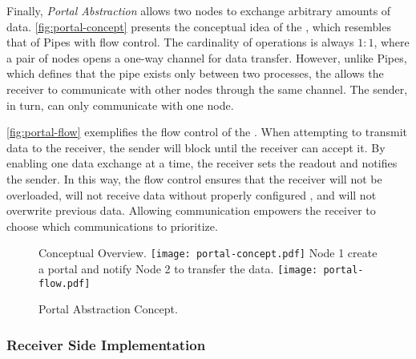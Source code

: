 			Finally, \textit{Portal Abstraction} allows two nodes to exchange arbitrary
			amounts of data. \autoref{fig:portal-concept} presents the conceptual idea
			of the \portal, which resembles that of \posix Pipes with flow control.
			The cardinality of operations is always $1:1$, where a pair of nodes opens
			a one-way channel for data transfer. However, unlike \posix Pipes, which
			defines that the pipe exists only between two processes, the \portal allows
			the receiver to communicate with other nodes through the same channel.
			The sender, in turn, can only communicate with one node.

			\autoref{fig:portal-flow} exemplifies the flow control of the \portal.
			When attempting to transmit data to the receiver, the sender will block
			until the receiver can accept it. By enabling one data exchange at a time,
			the receiver sets the readout and notifies the sender. In this way,
			the flow control ensures that the receiver will not be overloaded, will
			not receive data without properly configured \dma, and will not overwrite
			previous data. Allowing communication empowers the receiver to choose which
			communications to prioritize.

			\begin{figure}[!tb]
				\centering%
				\caption{Portal Abstraction Concept.}%
				\label{fig:portal}%

					{Conceptual Overview.}%
					{\texttt{[image: portal-concept.pdf]}}%
				\hspace{1cm}%
					{Node 1 create a portal and notify Node 2 to transfer the data.}%
					{\texttt{[image: portal-flow.pdf]}}%

			\end{figure}

			\subsubsection{Receiver Side Implementation}


